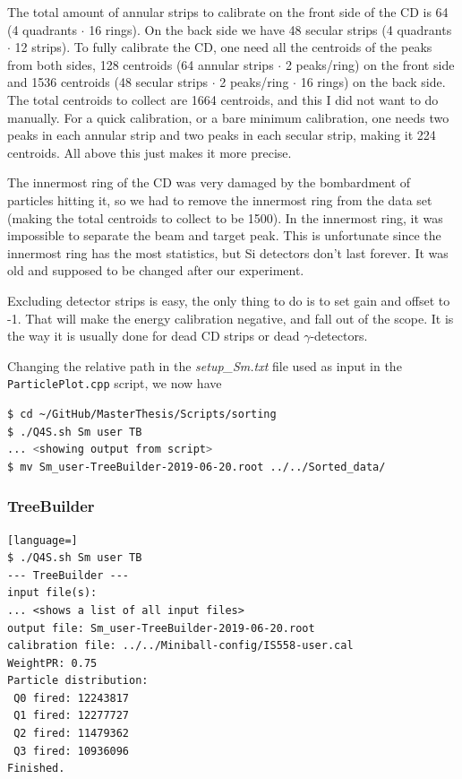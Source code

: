 \documentclass[twoside,english]{uiofysmaster/uiofysmaster}
\newcommand{\ga}{$\gamma$}
\begin{document}
The total amount of annular strips to calibrate on the front side of the CD is 64 (4 quadrants $\cdot$ 16 rings). 
On the back side we have 48 secular strips (4 quadrants $\cdot$ 12 strips). 
To fully calibrate the CD, one need all the centroids of the peaks from both sides, 128 centroids (64 annular strips $\cdot$ 2 peaks/ring) on the front side and 1536 centroids (48 secular strips $\cdot$ 2 peaks/ring $\cdot$ 16 rings) on the back side. 
The total centroids to collect are 1664 centroids, and this I did not want to do manually.
For a quick calibration, or a bare minimum calibration, one needs two peaks in each annular strip and two peaks in each secular strip, making it 224 centroids.
All above this just makes it more precise.

The innermost ring of the CD was very damaged by the bombardment of particles hitting it, so we had to remove the innermost ring from the data set (making the total centroids to collect to be 1500). 
In the innermost ring, it was impossible to separate the beam and target peak.
This is unfortunate since the innermost ring has the most statistics, but Si detectors don't last forever. 
It was old and supposed to be changed after our experiment. 

Excluding detector strips is easy, the only thing to do is to set gain and offset to -1. 
That will make the energy calibration negative, and fall out of the scope. 
It is the way it is usually done for dead CD strips or dead \ga-detectors. 

Changing the relative path in the \textit{setup\_Sm.txt} file used as input in the \texttt{ParticlePlot.cpp} script, we now have


\begin{lstlisting}[language=sh]
$ cd ~/GitHub/MasterThesis/Scripts/sorting 
$ ./Q4S.sh Sm user TB
... <showing output from script>
$ mv Sm_user-TreeBuilder-2019-06-20.root ../../Sorted_data/
\end{lstlisting}



\subsubsection*{TreeBuilder}
\begin{lstlisting}[language=]
$ ./Q4S.sh Sm user TB
--- TreeBuilder ---
input file(s):
... <shows a list of all input files>
output file: Sm_user-TreeBuilder-2019-06-20.root
calibration file: ../../Miniball-config/IS558-user.cal
WeightPR: 0.75
Particle distribution:
 Q0 fired: 12243817
 Q1 fired: 12277727
 Q2 fired: 11479362
 Q3 fired: 10936096
Finished.
\end{lstlisting}
\end{document}
